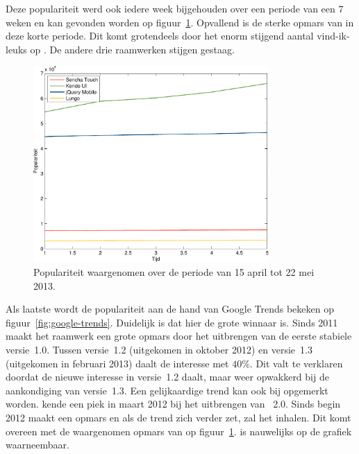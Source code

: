 Deze populariteit werd ook iedere week bijgehouden over een periode van een $7$ weken en kan gevonden worden op figuur~\ref{fig:populariteit-evolutie}.
Opvallend is de sterke opmars van \kendo{} in deze korte periode.
Dit komt grotendeels door het enorm stijgend aantal vind-ik-leuks op \fb{}.
De andere drie raamwerken stijgen gestaag.

\begin{figure}
  \centering
  \includegraphics[width=0.8\textwidth]{figuren/populariteit-tijd.pdf}
  \caption{Populariteit waargenomen over de periode van 15 april tot 22 mei 2013.}
  \label{fig:populariteit-evolutie}
\end{figure}

Als laatste wordt de populariteit aan de hand van Google Trends bekeken op figuur~\ref{fig:google-trends}.
Duidelijk is dat hier \jqm{} de grote winnaar is.
Sinds 2011 maakt het raamwerk een grote opmars door het uitbrengen van de eerste stabiele versie~1.0.
Tussen versie~1.2 (uitgekomen in oktober 2012) en versie~1.3 (uitgekomen in februari 2013) daalt de interesse met $40\%$.
Dit valt te verklaren doordat de nieuwe interesse in versie~1.2 daalt, maar weer opwakkerd bij de aankondiging van versie~1.3. 
Een gelijkaardige trend kan ook bij \st{} opgemerkt worden.
\st{} kende een piek in maart 2012 bij het uitbrengen van \st{}~2.0.
Sinds begin 2012 maakt \kendo{} een opmars en als de trend zich verder zet, zal het \st{} inhalen.
Dit komt overeen met de waargenomen opmars van \kendo{} op figuur~\ref{fig:populariteit-evolutie}.
\lungo{} is nauwelijks op de grafiek waarneembaar.

